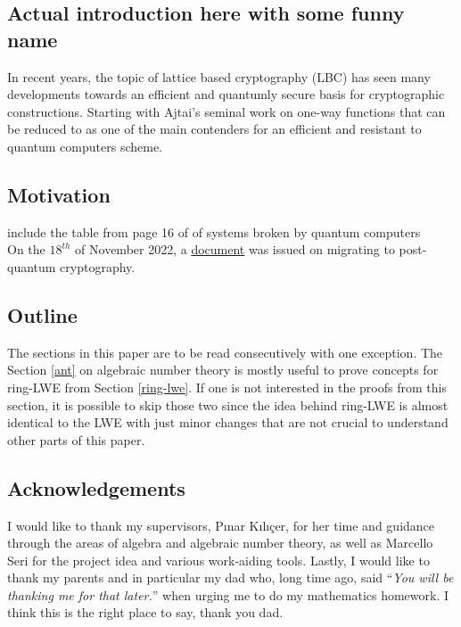 \subsection{Actual introduction here with some funny name}
In recent years, the topic of lattice based cryptography (LBC) has seen many developments towards an efficient and quantumly secure basis for cryptographic constructions. Starting with Ajtai's seminal work \cite{ajtai} on one-way functions that can be reduced to  as one of the main contenders for an efficient and resistant to quantum computers scheme.
\subsection{Motivation}
include the table from page 16 of \cite{bernstein} of systems broken by quantum computers\\
On the $18^{th}$ of November 2022, a \href{https://www.whitehouse.gov/wp-content/uploads/2022/11/M-23-02-M-Memo-on-Migrating-to-Post-Quantum-Cryptography.pdf}{document} was issued on migrating to post-quantum cryptography.

\iffalse
This bachelor thesis can be seen as a survey on the recent developments in the LBC and improvements in fully homomorphic cryptographic schemes. Nonetheless, there are few minor contributions that we note here.

Firstly, and most importantly, the introduction of many examples that we hope will be of great help for anyone trying to learn and understand LBC schemes. These include comptutations as well as images and tables that help visualize some key concepts related to Gaussian samples or lattices.

Secondly, we present and explicitly state few results that are otherwise left simply as claims or propositions. These mostly include parts on the algebraic number theory for the Section \ref{ring-lwe} on ring-LWE.
\fi

\subsection{Outline}
The sections in this paper are to be read consecutively with one exception. The Section \ref{ant} on algebraic number theory is mostly useful to prove concepts for ring-LWE from Section \ref{ring-lwe}. If one is not interested in the proofs from this section, it is possible to skip those two since the idea behind ring-LWE is almost identical to the LWE with just minor changes that are not crucial to understand other parts of this paper.

\subsection*{Acknowledgements}
I would like to thank my supervisors, Pınar Kılıçer, for her time and guidance through the areas of algebra and algebraic number theory, as well as Marcello Seri for the project idea and various work-aiding tools. Lastly, I would like to thank my parents and in particular my dad who, long time ago, said ``\textit{You will be thanking me for that later.}'' when urging me to do my mathematics homework. I think this is the right place to say, thank you dad.
